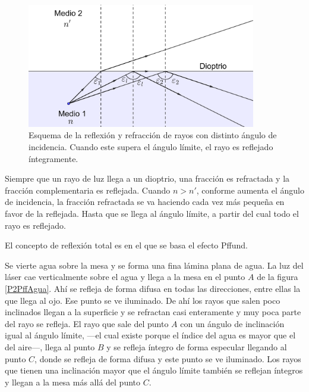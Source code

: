 \documentclass[12pt]{article}
\numberwithin{table}{section}
\numberwithin{figure}{section}
\numberwithin{equation}{section}
\begin{document}
\begin{figure}[!ht]
	\small \centering \sffamily
	\begin{center}
		\includegraphics[width=10cm]{P2Angulolimite.png}
		\caption{Esquema de la reflexión y refracción de rayos con distinto ángulo de incidencia. Cuando este supera el ángulo límite, el rayo es reflejado íntegramente.}
		\label{P2figangulolimite}
	\end{center}
\end{figure}

Siempre que un rayo de luz llega a un dioptrio, una fracción es refractada y la fracción complementaria es reflejada. Cuando $n>n'$, conforme aumenta el ángulo de incidencia, la fracción refractada se va haciendo cada vez más pequeña en favor de la reflejada. Hasta que se llega al ángulo límite, a partir del cual todo el rayo es reflejado.

El concepto de reflexión total es en el que se basa el efecto Pffund.

Se vierte agua sobre la mesa y se forma una fina lámina plana de agua. La luz del láser cae verticalmente sobre el agua y llega a la mesa en el punto $A$ de la figura \ref{P2PffAgua}. Ahí se refleja de forma difusa en todas las direcciones, entre ellas la que llega al ojo. Ese punto se ve iluminado. De ahí los rayos que salen poco inclinados llegan a la superficie y se refractan casi enteramente y muy poca parte del rayo se refleja. El rayo que sale del punto $A$ con un ángulo de inclinación igual al ángulo límite, ---el cual existe porque el índice del agua es mayor que el del aire---, llega al punto $B$ y se refleja íntegro de forma especular llegando al punto $C$, donde se refleja de forma difusa y este punto se ve iluminado. Los rayos que tienen una inclinación mayor que el ángulo límite también se reflejan íntegros y llegan a la mesa más allá del punto $C$.
\end{document}

